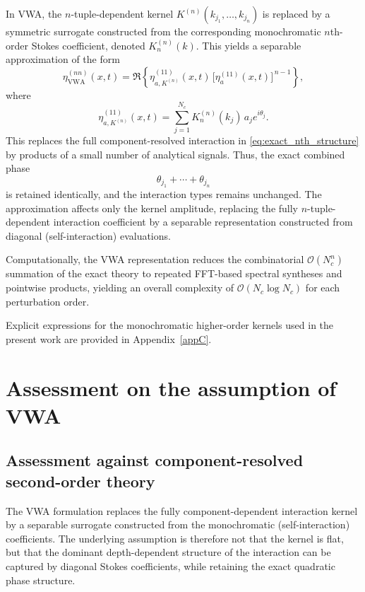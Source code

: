 \documentclass[lineno]{JFM-FLM_Au}
\begin{document}
In VWA, the $n$-tuple-dependent kernel $K^{(n)}(k_{j_1},\dots,k_{j_n})$ is replaced by a symmetric surrogate constructed from the corresponding monochromatic $n$th-order Stokes coefficient, denoted $K^{(n)}_{n}(k)$. 
This yields a separable approximation of the form
\begin{equation}\label{eq:VWA_nth_structure}
\eta^{(n n)}_{\mathrm{VWA}}(x,t)
=
\Re\left\{
\eta_{a,K^{(n)}}^{(11)}(x,t)\,
\bigl[\eta_a^{(11)}(x,t)\bigr]^{\,n-1}
\right\},
\end{equation}
where
\[
\eta_{a,K^{(n)}}^{(11)}(x,t)
=
\sum_{j=1}^{N_c}
K^{(n)}_{n}(k_j)\,a_j e^{i\theta_j}.
\]
This replaces the full component-resolved interaction in \cref{eq:exact_nth_structure} by products of a small number of analytical signals. Thus, the exact combined phase
\[
\theta_{j_1}+\cdots+\theta_{j_n}
\]
is retained identically, and the interaction types remains unchanged. 
The approximation affects only the kernel amplitude, replacing the fully $n$-tuple-dependent interaction coefficient by a separable representation constructed from diagonal (self-interaction) evaluations.

Computationally, the VWA representation reduces the combinatorial $\mathcal{O}(N_c^n)$ summation of the exact theory to repeated FFT-based spectral syntheses and pointwise products, yielding an overall complexity of $\mathcal{O}(N_c\log N_c)$ for each perturbation order.

Explicit expressions for the monochromatic higher-order kernels used in the present work are provided in Appendix~\ref{appC}.

\section{Assessment on the assumption of VWA}\label{sec:examinationofassumption}

\subsection{Assessment against component-resolved second-order theory}\label{method:2nd_kernel_comparison}

The VWA formulation replaces the fully component-dependent interaction kernel by a separable surrogate constructed from the monochromatic (self-interaction) coefficients. 
The underlying assumption is therefore not that the kernel is flat, but that the dominant depth-dependent structure of the interaction can be captured by diagonal Stokes coefficients, while retaining the exact quadratic phase structure.
\end{document}
